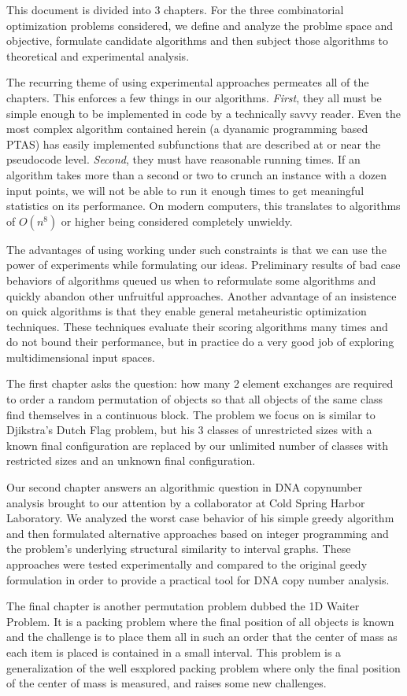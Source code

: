This document is divided into 3 chapters.  For the three combinatorial optimization problems considered, we define and analyze the problme space and objective, formulate candidate algorithms and then subject those algorithms to theoretical and experimental analysis.

The recurring theme of using experimental approaches permeates all of the chapters.  This enforces a few things in our algorithms. {\it First}, they all must be simple enough to be implemented in code by a technically savvy reader.  Even the most complex algorithm contained herein (a dyanamic programming based PTAS) has easily implemented subfunctions that are described at or near the pseudocode level.  {\it Second}, they must have reasonable running times.  If an algorithm takes more than a second or two to crunch an instance with a dozen input points, we will not be able to run it enough times to get meaningful statistics on its performance.  On modern computers, this translates to algorithms of $O(n^8)$ or higher being considered completely unwieldy.

The advantages of using working under such constraints is that we can use the power of experiments while formulating our ideas. Preliminary results of bad case behaviors of algorithms queued us when to reformulate some algorithms and quickly abandon other unfruitful approaches. Another advantage of an insistence on quick algorithms is that they enable general metaheuristic optimization techniques. These techniques evaluate their scoring algorithms many times and do not bound their performance, but in practice do a very good job of exploring multidimensional input spaces.

The first chapter asks the question: how many 2 element exchanges are required to order a random permutation of objects so that all objects of the same class find themselves in a continuous block. The problem we focus on is similar to Djikstra’s Dutch Flag problem, but his 3 classes of unrestricted sizes with a known final configuration are replaced by our unlimited number of classes with restricted sizes and an unknown final configuration.

Our second chapter answers an algorithmic question in DNA copynumber analysis brought to our attention by a collaborator at Cold Spring Harbor Laboratory. We analyzed the worst case behavior of his simple greedy algorithm and then formulated alternative approaches based on integer programming and the problem’s underlying structural similarity to interval graphs.  These approaches were tested experimentally and compared to the original geedy formulation in order to provide a practical tool for DNA copy number analysis.

The final chapter is another permutation problem dubbed the 1D Waiter Problem.  It is a packing problem where the final position of all objects is known and the challenge is to place them all in such an order that the center of mass as each item is placed is contained in a small interval.  This problem is a generalization of the well esxplored packing problem where only the final position of the center of mass is measured, and raises some new challenges.  
